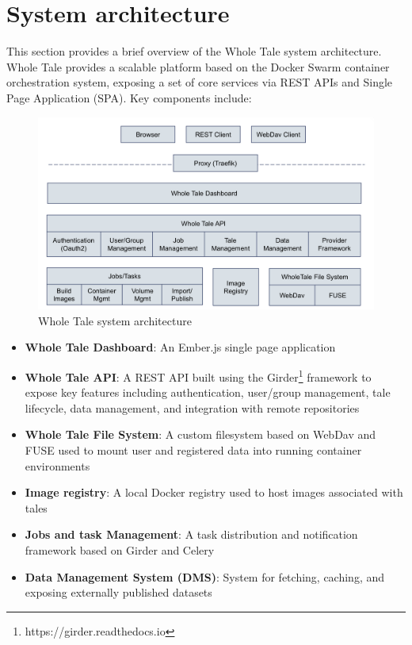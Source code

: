 \documentclass[conference]{IEEEtran}
\begin{document}
\section{System architecture} \label{architecture}

This section provides a brief overview of the Whole Tale system architecture. Whole Tale 
provides a scalable platform based on the Docker Swarm container orchestration system, exposing a 
set of core services via REST APIs and Single Page Application (SPA). Key components include:

\begin{figure}
\centering
\includegraphics[scale=0.25]{images/wholetale-architecture.png}
\caption{Whole Tale system architecture}
\end{figure}

\begin{itemize}
\item{{\bf Whole Tale Dashboard}: An Ember.js single page application}
\item{{\bf Whole Tale API}: A REST API built using the Girder\footnote{https://girder.readthedocs.io} framework to expose key features including authentication, user/group management, tale lifecycle, data management, and integration with remote repositories}
\item{{\bf Whole Tale File System}: A custom filesystem based on WebDav and FUSE used to mount user and registered data into running container environments}
\item{{\bf Image registry}: A local Docker registry used to host images associated with tales}
\item{{\bf Jobs and task Management}: A task distribution and notification framework based on Girder and Celery}
\item{{\bf Data Management System (DMS)}: System for fetching, caching, and exposing externally published datasets}
\end{itemize}
\end{document}
